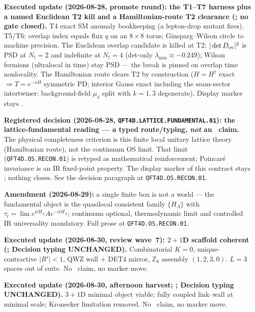 \par\smallskip\noindent\textbf{Executed update (2026-08-28, promote round): the T1--T7 harness
plus a named Euclidean T2 kill and a Hamiltonian-route T2 clearance
(; no gate closed).}
T4 exact SM anomaly bookkeeping (a lepton-drop mutant fires).  T5/T6: overlap index equals flux
$q$ on an $8\times8$ torus; Ginsparg--Wilson circle to machine precision.  The Euclidean overlap
candidate is killed at T2: $|\det D_{\rm ov}|^2$ is PSD at $N_t=2$ and indefinite at $N_t=4$
(det-only $\lambda_{\min}\approx-0.249$); Wilson fermions (ultralocal in time) stay PSD --- the
break is pinned on overlap time nonlocality.  The Hamiltonian route clears T2 by construction
($H=H^\dagger$ exact $\Rightarrow T=e^{-aH}$ symmetric PD; interior Gauss exact including the
seam-sector intertwiner; background-field $\mu_4$ split with $k=1,3$ degenerate).  Display
marker stays \mO.

\par\smallskip\noindent\textbf{Registered decision (2026-08-28,
\texttt{QFT4D.LATTICE.FUNDAMENTAL.01}): the lattice-fundamental reading --- a typed
route/typing, \emph{not} an \mE\ claim.}
The physical completeness criterion is this finite local unitary lattice theory (Hamiltonian
route), not the continuum OS limit.  That limit (\texttt{QFT4D.OS.RECON.01}) is retyped as
mathematical reinforcement; Poincar\'e invariance is an IR fixed-point property.  The display
marker of this contract stays \mO; nothing closes.  See the decision paragraph at
\texttt{QFT4D.OS.RECON.01}.

\par\smallskip\noindent\textbf{Amendment (2026-08-29):} a single finite box is not a world ---
the fundamental object is the quasilocal consistent family $\{H_\Lambda\}$ with
$\tau_t=\lim e^{itH_\Lambda}A e^{-itH_\Lambda}$; continuum optional, thermodynamic limit and
controlled IR universality mandatory.  Full prose at \texttt{QFT4D.OS.RECON.01}.

\par\smallskip\noindent\textbf{Executed update (2026-08-30, review wave~7): $2{+}1$D scaffold
coherent (;
Decision typing UNCHANGED).}
Combinatorial $K=0$, unique-contractive $\lvert R'\rvert<1$, QWZ wall $+$ DET4 mirror,
$\mathbb Z_6$ assembly $(1,2,3,0)$.  $L=3$ spaces out of suite.  No \mE\ claim, no marker move.

\par\smallskip\noindent\textbf{Executed update (2026-08-30, afternoon harvest;
;
Decision typing UNCHANGED).}
$3{+}1$D minimal object viable; fully coupled link--wall at minimal scale; Kronecker
limitation removed.  No \mE\ claim, no marker move.


